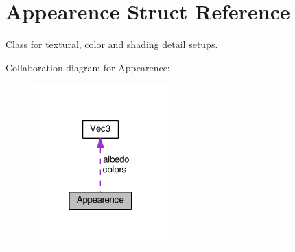 \hypertarget{struct_appearence}{}\section{Appearence Struct Reference}
\label{struct_appearence}


Class for textural, color and shading detail setups.  




Collaboration diagram for Appearence\+:
\nopagebreak
\begin{figure}[H]
\begin{center}
\leavevmode
\includegraphics[width=148pt]{struct_appearence__coll__graph}
\end{center}
\end{figure}
